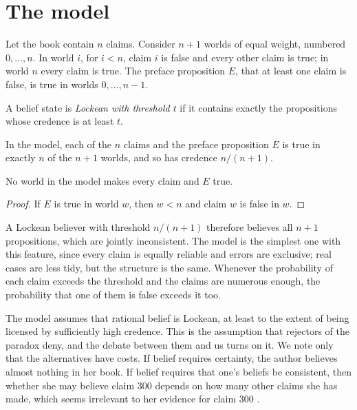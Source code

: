 \documentclass{situationist-preprint}
\begin{document}
\section{The model}

Let the book contain $n$ claims. Consider $n + 1$ worlds of equal weight, numbered $0, \ldots, n$. In world $i$, for $i < n$, claim $i$ is false and every other claim is true; in world $n$ every claim is true. The preface proposition $E$, that at least one claim is false, is true in worlds $0, \ldots, n - 1$.

\begin{definition}\label{d:lockean}
A belief state is \emph{Lockean with threshold $t$} if it contains exactly the propositions whose credence is at least $t$.
\end{definition}

\begin{proposition}\label{p:threshold}
In the model, each of the $n$ claims and the preface proposition $E$ is true in exactly $n$ of the $n + 1$ worlds, and so has credence $n/(n+1)$.
\end{proposition}

\begin{proposition}\label{p:inconsistent}
No world in the model makes every claim and $E$ true.
\end{proposition}

\begin{proof}
If $E$ is true in world $w$, then $w < n$ and claim $w$ is false in $w$.
\end{proof}

A Lockean believer with threshold $n/(n+1)$ therefore believes all $n + 1$ propositions, which are jointly inconsistent. The model is the simplest one with this feature, since every claim is equally reliable and errors are exclusive; real cases are less tidy, but the structure is the same. Whenever the probability of each claim exceeds the threshold and the claims are numerous enough, the probability that one of them is false exceeds it too.

The model assumes that rational belief is Lockean, at least to the extent of being licensed by sufficiently high credence. This is the assumption that rejectors of the paradox deny, and the debate between them and us turns on it. We note only that the alternatives have costs. If belief requires certainty, the author believes almost nothing in her book. If belief requires that one's beliefs be consistent, then whether she may believe claim 300 depends on how many other claims she has made, which seems irrelevant to her evidence for claim 300 \citep{Christensen2004}.
\end{document}
